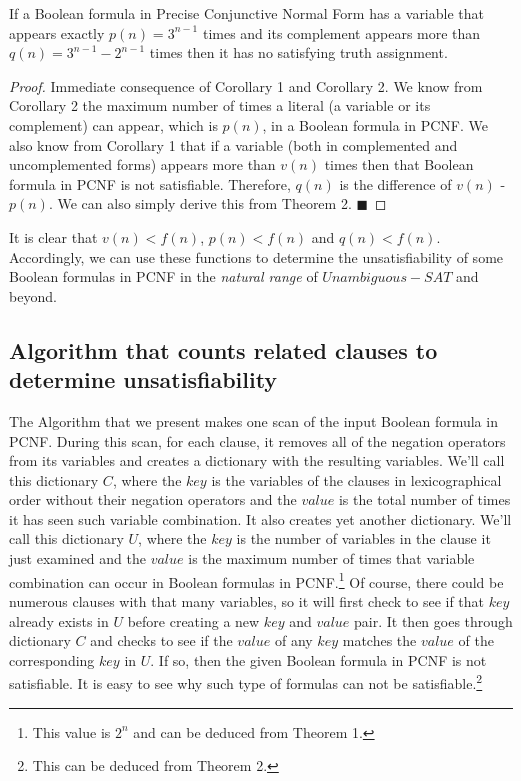 \documentclass[runningheads,a4paper]{llncs}
\begin{document}
\begin{corollary}\normalfont
If a Boolean formula in Precise Conjunctive Normal Form has a variable that appears exactly $p(n) = 3^{n-1}$ times and its complement appears more than $q(n) = 3^{n-1}-2^{n-1}$ times then it has no satisfying truth assignment. 
\begin{proof}\normalfont
Immediate consequence of Corollary 1 and Corollary 2. We know from Corollary 2 the maximum number of times a literal (a variable or its complement) can appear, which is $p(n)$, in a Boolean formula in PCNF. We also know from Corollary 1 that if a variable (both in complemented and uncomplemented forms) appears more than $v(n)$ times then that Boolean formula in PCNF is not satisfiable. Therefore, $q(n)$ is the difference of $v(n)$ - $p(n)$. We can also simply derive this from Theorem 2. $\blacksquare$
\end{proof}
\end{corollary}

It is clear that $v(n) < f(n)$,  $p(n) < f(n)$ and $q(n) < f(n)$. Accordingly, we can use these functions to determine the unsatisfiability of some Boolean formulas in PCNF in the \emph{natural range} of ${Unambiguous-SAT}$ and beyond. 

\subsection{Algorithm that counts related clauses to determine unsatisfiability}

The Algorithm that we present makes one scan of the input Boolean formula in PCNF. During this scan, for each clause, it removes all of the negation operators from its variables and creates a dictionary with the resulting variables. We'll call this dictionary $C$, where the $key$ is the variables of the clauses in lexicographical order without their negation operators and the $value$ is the total number of times it has seen such variable combination. It also creates yet another dictionary. We'll call this dictionary $U$, where the $key$ is the number of variables in the clause it just examined and the $value$ is the maximum number of times that variable combination can occur in Boolean formulas in PCNF.\footnote{This value is $2^{n}$ and can be deduced from Theorem 1.} Of course, there could be numerous clauses with that many variables, so it will first check to see if that $key$ already exists in $U$ before creating a new $key$ and $value$ pair. It then goes through dictionary $C$ and checks to see if the $value$ of any $key$ matches the $value$ of the corresponding $key$ in $U$. If so, then the given Boolean formula in PCNF is not satisfiable. It is easy to see why such type of formulas can not be satisfiable.\footnote{This can be deduced from Theorem 2.}
\end{document}
